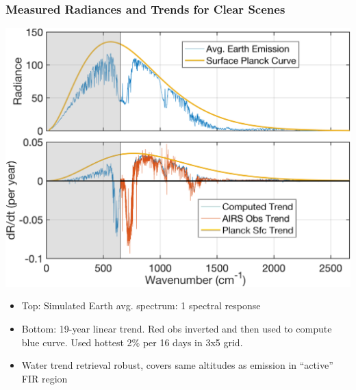 \documentclass[10pt,t]{beamer}
\begin{document}
\begin{frame}
\frametitle{Measured Radiances and Trends for Clear Scenes}
\centering \includegraphics[width=0.6\linewidth]{Figslls/rad_trends_all_cm.png}
\begin{small}
\begin{itemize}
\item Top: Simulated Earth avg. spectrum: 1 \wn spectral response
\item Bottom: 19-year linear trend.  Red obs inverted and then used to compute blue curve.  Used hottest 2\% per 16 days in 3x5 grid.
\item Water trend retrieval robust, covers same altitudes as emission in ``active'' FIR region
\end{itemize}
\end{small}
\end{frame}
\end{document}
